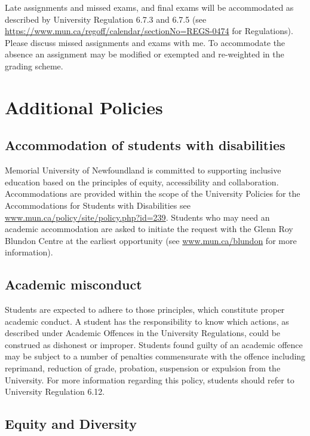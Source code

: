 \documentclass[
]{book}
\begin{document}
Late assignments and missed exams, and final exams will be accommodated as described by University Regulation 6.7.3 and 6.7.5 (see \url{https://www.mun.ca/regoff/calendar/sectionNo=REGS-0474} for Regulations). Please discuss missed assignments and exams with me. To accommodate the absence an assignment may be modified or exempted and re-weighted in the grading scheme.

\hypertarget{additional-policies}{%
\section{Additional Policies}\label{additional-policies}}

\hypertarget{accommodation-of-students-with-disabilities}{%
\subsection{Accommodation of students with disabilities}\label{accommodation-of-students-with-disabilities}}

Memorial University of Newfoundland is committed to supporting inclusive education based on the principles of equity, accessibility and collaboration. Accommodations are provided within the scope of the University Policies for the Accommodations for Students with Disabilities see \url{www.mun.ca/policy/site/policy.php?id=239}. Students who may need an academic accommodation are asked to initiate the request with the Glenn Roy Blundon Centre at the earliest opportunity (see \url{www.mun.ca/blundon} for more information).

\hypertarget{academic-misconduct}{%
\subsection{Academic misconduct}\label{academic-misconduct}}

Students are expected to adhere to those principles, which constitute proper academic conduct. A student has the responsibility to know which actions, as described under Academic Offences in the University Regulations, could be construed as dishonest or improper. Students found guilty of an academic offence may be subject to a number of penalties commensurate with the offence including reprimand, reduction of grade, probation, suspension or expulsion from the University. For more information regarding this policy, students should refer to University Regulation 6.12.

\hypertarget{equity-and-diversity}{%
\subsection{Equity and Diversity}\label{equity-and-diversity}}
\end{document}
